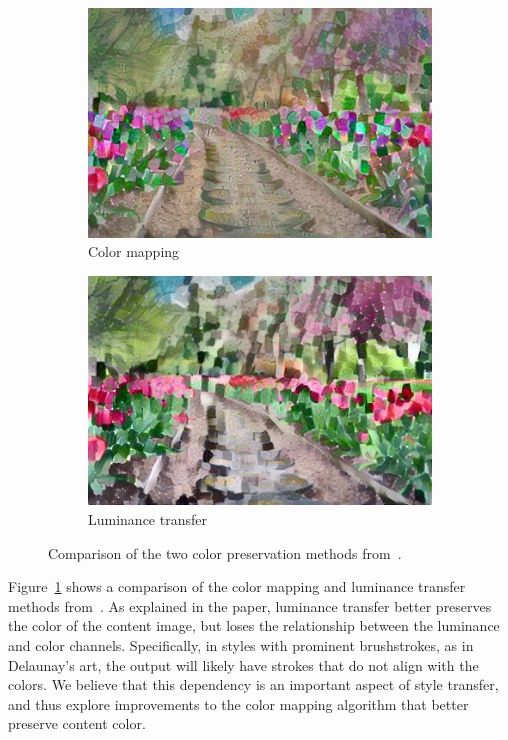 \documentclass[10pt,twocolumn,letterpaper]{article}
\begin{document}
\begin{figure}[ht]
\centering
\begin{subfigure}[b]{0.48\linewidth}
  \centering
  \includegraphics[width=\linewidth]{imgs/flowers-rgb-eig.jpg}
  \caption{Color mapping}
\end{subfigure}
\quad
\begin{subfigure}[b]{0.48\linewidth}
  \centering
  \includegraphics[width=\linewidth]{imgs/flowers-luminance.jpg}
  \caption{Luminance transfer}
\end{subfigure}
\caption{Comparison of the two color preservation methods from~\cite{gatys-color}.}
\label{fig:color-orig}
\end{figure}

Figure~\ref{fig:color-orig} shows a comparison of the color mapping and luminance transfer methods from~\cite{gatys-color}. As explained in the paper, luminance transfer better preserves the color of the content image, but loses the relationship between the luminance and color channels. Specifically, in styles with prominent brushstrokes, as in Delaunay's art, the output will likely have strokes that do not align with the colors. We believe that this dependency is an important aspect of style transfer, and thus explore improvements to the color mapping algorithm that better preserve content color.
\end{document}
